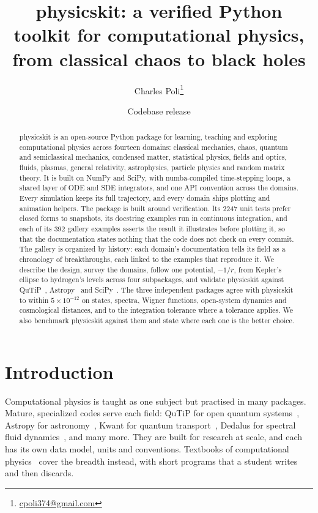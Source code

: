 \documentclass[11pt,a4paper]{article}
\title{physicskit: a verified Python toolkit for computational physics,\\
       from classical chaos to black holes}
\author{Charles Poli\thanks{\href{mailto:cpoli374@gmail.com}{cpoli374@gmail.com}}}
\date{Codebase release \physicskitversion}
\begin{document}
\maketitle

\begin{abstract}
physicskit is an open-source Python package for learning, teaching and
exploring computational physics across fourteen domains: classical
mechanics, chaos, quantum and semiclassical mechanics, condensed matter,
statistical physics, fields and optics, fluids, plasmas, general relativity,
astrophysics, particle physics and random matrix theory. It is built on
NumPy and SciPy, with numba-compiled time-stepping loops, a shared layer of
ODE and SDE integrators, and one API convention across the domains. Every
simulation keeps its full trajectory, and every domain ships plotting and
animation helpers. The package is built around verification. Its 2247 unit
tests prefer closed forms to snapshots, its docstring examples run in
continuous integration, and each of its 392 gallery examples asserts the
result it illustrates before plotting it, so that the documentation states
nothing that the code does not check on every commit. The gallery is
organized by history: each domain's documentation tells its field as a
chronology of breakthroughs, each linked to the examples that reproduce
it. We describe the design, survey the domains, follow one potential, $-1/r$,
from Kepler's ellipse to hydrogen's levels across four subpackages, and
validate physicskit against QuTiP~\cite{johansson2012,lambert2024},
Astropy~\cite{astropy2022} and SciPy~\cite{virtanen2020}. The three
independent packages agree with physicskit to within $5\times10^{-12}$
on states, spectra, Wigner functions, open-system dynamics and cosmological
distances, and to the integration tolerance where a tolerance applies. We
also benchmark physicskit against them and state where each one is the
better choice.
\end{abstract}

\tableofcontents

\section{Introduction}
\label{sec:intro}

Computational physics is taught as one subject but practised in many
packages. Mature, specialized codes serve each field: QuTiP for open
quantum systems~\cite{johansson2012,lambert2024}, Astropy for
astronomy~\cite{astropy2022}, Kwant for quantum transport~\cite{groth2014},
Dedalus for spectral fluid dynamics~\cite{burns2020}, and many more. They
are built for research at scale, and each has its own data model, units
and conventions. Textbooks of computational physics~\cite{newman2013,landau2015}
cover the breadth instead, with short programs that a student writes and
then discards.
\end{document}

